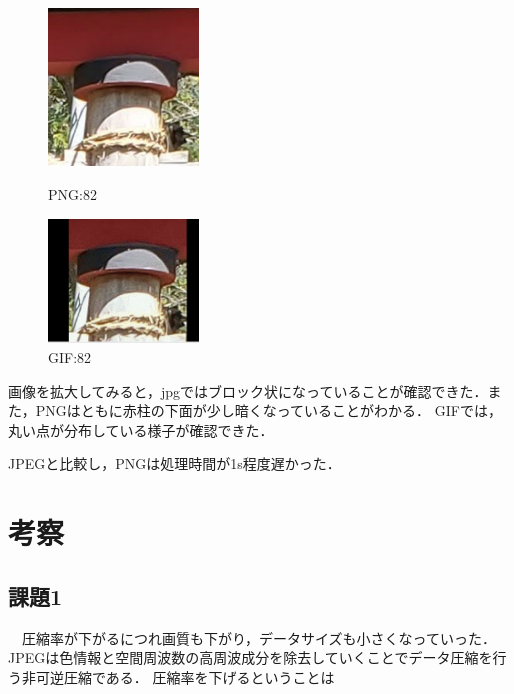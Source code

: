\documentclass[a4paper,11pt]{bxjsarticle}
\begin{document}
     \begin{figure}[htbp]
      \begin{minipage}{0.5\hsize}
       \begin{center}
        \includegraphics[width=40mm]{sample_p82_tri.png}
       \end{center}
       \caption{PNG:82}
       \label{fig:p82}
      \end{minipage}
      \begin{minipage}{0.5\hsize}
       \begin{center}
        \includegraphics[width=40mm]{sample_g82_tri.jpg}
       \end{center}
       \caption{GIF:82}
       \label{fig:g82}
      \end{minipage}
     \end{figure}

  画像を拡大してみると，jpgではブロック状になっていることが確認できた．また，PNGはともに赤柱の下面が少し暗くなっていることがわかる．
  GIFでは，丸い点が分布している様子が確認できた．

  JPEGと比較し，PNGは処理時間が1s程度遅かった．
  　

\section{考察}
\subsection{課題1}
　圧縮率が下がるにつれ画質も下がり，データサイズも小さくなっていった．JPEGは色情報と空間周波数の高周波成分を除去していくことでデータ圧縮を行う非可逆圧縮である．
圧縮率を下げるということは
\end{document}
